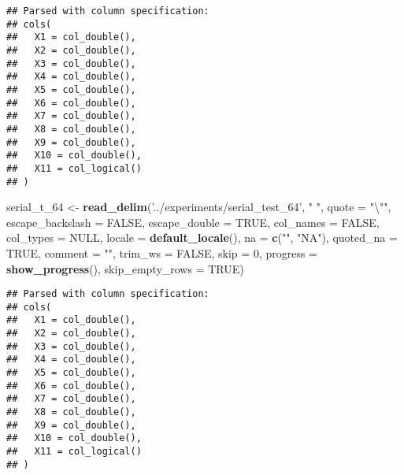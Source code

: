 \documentclass[]{article}
\newenvironment{Shaded}{\begin{snugshade}}{\end{snugshade}}
\newcommand{\KeywordTok}[1]{\textcolor[rgb]{0.13,0.29,0.53}{\textbf{#1}}}
\newcommand{\DataTypeTok}[1]{\textcolor[rgb]{0.13,0.29,0.53}{#1}}
\newcommand{\DecValTok}[1]{\textcolor[rgb]{0.00,0.00,0.81}{#1}}
\newcommand{\CharTok}[1]{\textcolor[rgb]{0.31,0.60,0.02}{#1}}
\newcommand{\StringTok}[1]{\textcolor[rgb]{0.31,0.60,0.02}{#1}}
\newcommand{\OtherTok}[1]{\textcolor[rgb]{0.56,0.35,0.01}{#1}}
\newcommand{\NormalTok}[1]{#1}
\begin{document}
\begin{verbatim}
## Parsed with column specification:
## cols(
##   X1 = col_double(),
##   X2 = col_double(),
##   X3 = col_double(),
##   X4 = col_double(),
##   X5 = col_double(),
##   X6 = col_double(),
##   X7 = col_double(),
##   X8 = col_double(),
##   X9 = col_double(),
##   X10 = col_double(),
##   X11 = col_logical()
## )
\end{verbatim}

\begin{Shaded}
\begin{Highlighting}[]
\NormalTok{serial_t_}\DecValTok{64}\NormalTok{ <-}\StringTok{ }\KeywordTok{read_delim}\NormalTok{(}\StringTok{'../experiments/serial_test_64'}\NormalTok{, }\StringTok{" "}\NormalTok{, }\DataTypeTok{quote =} \StringTok{"}\CharTok{\textbackslash{}"}\StringTok{"}\NormalTok{, }\DataTypeTok{escape_backslash =} \OtherTok{FALSE}\NormalTok{,}
  \DataTypeTok{escape_double =} \OtherTok{TRUE}\NormalTok{, }\DataTypeTok{col_names =} \OtherTok{FALSE}\NormalTok{, }\DataTypeTok{col_types =} \OtherTok{NULL}\NormalTok{,}
  \DataTypeTok{locale =} \KeywordTok{default_locale}\NormalTok{(), }\DataTypeTok{na =} \KeywordTok{c}\NormalTok{(}\StringTok{""}\NormalTok{, }\StringTok{"NA"}\NormalTok{), }\DataTypeTok{quoted_na =} \OtherTok{TRUE}\NormalTok{,}
  \DataTypeTok{comment =} \StringTok{""}\NormalTok{, }\DataTypeTok{trim_ws =} \OtherTok{FALSE}\NormalTok{, }\DataTypeTok{skip =} \DecValTok{0}\NormalTok{, }
 \DataTypeTok{progress =} \KeywordTok{show_progress}\NormalTok{(),}
  \DataTypeTok{skip_empty_rows =} \OtherTok{TRUE}\NormalTok{)}
\end{Highlighting}
\end{Shaded}

\begin{verbatim}
## Parsed with column specification:
## cols(
##   X1 = col_double(),
##   X2 = col_double(),
##   X3 = col_double(),
##   X4 = col_double(),
##   X5 = col_double(),
##   X6 = col_double(),
##   X7 = col_double(),
##   X8 = col_double(),
##   X9 = col_double(),
##   X10 = col_double(),
##   X11 = col_logical()
## )
\end{verbatim}
\end{document}
